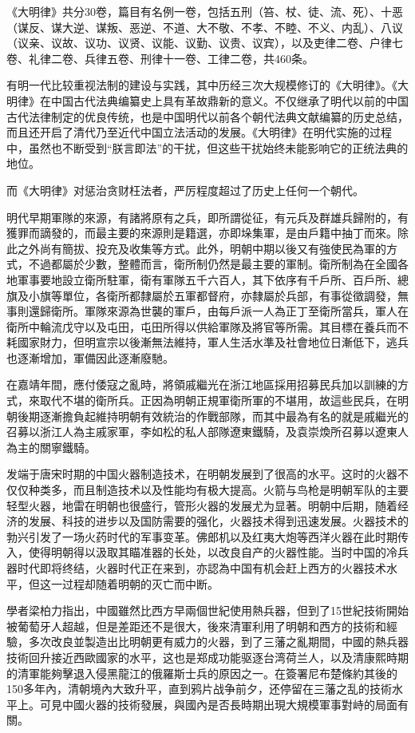 《大明律》共分30卷，篇目有名例一卷，包括五刑（笞、杖、徒、流、死）、十恶（谋反、谋大逆、谋叛、恶逆、不道、大不敬、不孝、不睦、不义、内乱）、八议（议亲、议故、议功、议贤、议能、议勤、议贵、议宾），以及吏律二卷、户律七卷、礼律二卷、兵律五卷、刑律十一卷、工律二卷，共460条。

有明一代比较重视法制的建设与实践，其中历经三次大规模修订的《大明律》。《大明律》在中国古代法典编纂史上具有革故鼎新的意义。不仅继承了明代以前的中国古代法律制定的优良传统，也是中国明代以前各个朝代法典文献编纂的历史总结，而且还开启了清代乃至近代中国立法活动的发展。《大明律》在明代实施的过程中，虽然也不断受到“朕言即法”的干扰，但这些干扰始终未能影响它的正统法典的地位。

而《大明律》对惩治贪财枉法者，严厉程度超过了历史上任何一个朝代。

明代早期軍隊的來源，有諸將原有之兵，即所謂從征，有元兵及群雄兵歸附的，有獲罪而謫發的，而最主要的來源則是籍選，亦即垛集軍，是由戶籍中抽丁而來。除此之外尚有簡拔、投充及收集等方式。此外，明朝中期以後又有強使民為軍的方式，不過都屬於少數，整體而言，衛所制仍然是最主要的軍制。衛所制為在全國各地軍事要地設立衛所駐軍，衛有軍隊五千六百人，其下依序有千戶所、百戶所、總旗及小旗等單位，各衛所都隸屬於五軍都督府，亦隸屬於兵部，有事從徵調發，無事則還歸衛所。軍隊來源為世襲的軍戶，由每戶派一人為正丁至衛所當兵，軍人在衛所中輪流戊守以及屯田，屯田所得以供給軍隊及將官等所需。其目標在養兵而不耗國家財力，但明宣宗以後漸無法維持，軍人生活水準及社會地位日漸低下，逃兵也逐漸增加，軍備因此逐漸廢馳。

在嘉靖年間，應付倭寇之亂時，將領戚繼光在浙江地區採用招募民兵加以訓練的方式，來取代不堪的衛所兵。正因為明朝正規軍衛所軍的不堪用，故這些民兵，在明朝後期逐漸擔負起維持明朝有效統治的作戰部隊，而其中最為有名的就是戚繼光的召募以浙江人為主戚家軍，李如松的私人部隊遼東鐵騎，及袁崇煥所召募以遼東人為主的關寧鐵騎。

发端于唐宋时期的中国火器制造技术，在明朝发展到了很高的水平。这时的火器不仅仅种类多，而且制造技术以及性能均有极大提高。火箭与鸟枪是明朝军队的主要轻型火器，地雷在明朝也很盛行，管形火器的发展尤为显著。明朝中后期，随着经济的发展、科技的进步以及国防需要的强化，火器技术得到迅速发展。火器技术的勃兴引发了一场火药时代的军事变革。佛郎机以及红夷大炮等西洋火器在此时期传入，使得明朝得以汲取其瞄准器的长处，以改良自产的火器性能。当时中国的冷兵器时代即将终结，火器时代正在来到，亦認為中国有机会赶上西方的火器技术水平，但这一过程却随着明朝的灭亡而中断。

學者梁柏力指出，中國雖然比西方早兩個世紀使用熱兵器，但到了15世紀技術開始被葡萄牙人超越，但是差距还不是很大，後來清軍利用了明朝和西方的技術和經驗，多次改良並製造出比明朝更有威力的火器，到了三藩之亂期間，中國的熱兵器技術回升接近西歐國家的水平，这也是郑成功能驱逐台湾荷兰人，以及清康熙時期的清軍能夠擊退入侵黑龍江的俄羅斯士兵的原因之一。在簽署尼布楚條約其後的150多年內，清朝境內大致升平，直到鸦片战争前夕，还停留在三藩之乱的技術水平上。可見中國火器的技術發展，與國內是否長時期出現大規模軍事對峙的局面有關。

